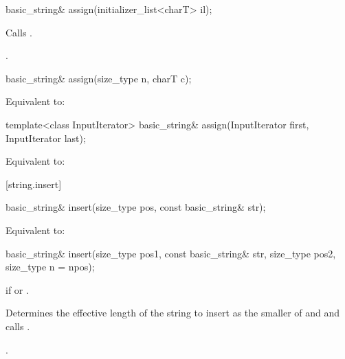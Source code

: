 %
\begin{itemdecl}
basic_string& assign(initializer_list<charT> il);
\end{itemdecl}

\begin{itemdescr}
\pnum
\effects Calls .

\pnum
\returns
{}.
\end{itemdescr}


%
\begin{itemdecl}
basic_string& assign(size_type n, charT c);
\end{itemdecl}

\begin{itemdescr}
\pnum
\effects Equivalent to: 
\end{itemdescr}

%
\begin{itemdecl}
template<class InputIterator>
  basic_string& assign(InputIterator first, InputIterator last);
\end{itemdecl}

\begin{itemdescr}
\pnum
\effects Equivalent to: 
\end{itemdescr}

[string.insert]{}

%
\begin{itemdecl}
basic_string& insert(size_type pos, const basic_string& str);
\end{itemdecl}

\begin{itemdescr}
\pnum
\effects Equivalent to: 
\end{itemdescr}

%
\begin{itemdecl}
basic_string& insert(size_type pos1, const basic_string& str, size_type pos2, size_type n = npos);
\end{itemdecl}

\begin{itemdescr}
\pnum
\throws
{}
if
or
.

\pnum
\effects
Determines the effective length  of the string to insert as the smaller
of  and
 and calls .

\pnum
\returns
{}.
\end{itemdescr}

